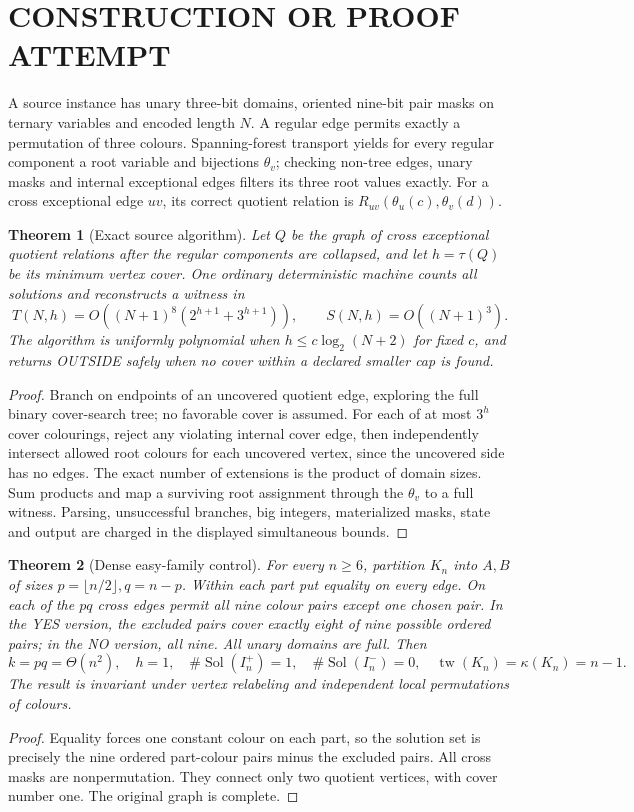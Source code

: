 \documentclass{article}
\newtheorem{theorem}{Theorem}
\begin{document}
\section{CONSTRUCTION OR PROOF ATTEMPT}
A source instance has unary three-bit domains, oriented nine-bit pair masks on ternary variables and encoded length $N$. A regular edge permits exactly a permutation of three colours. Spanning-forest transport yields for every regular component a root variable and bijections $\theta_v$; checking non-tree edges, unary masks and internal exceptional edges filters its three root values exactly. For a cross exceptional edge $uv$, its correct quotient relation is $R_{uv}(\theta_u(c),\theta_v(d))$.

\begin{theorem}[Exact source algorithm]
Let $Q$ be the graph of cross exceptional quotient relations after the regular components are collapsed, and let $h=\tau(Q)$ be its minimum vertex cover. One ordinary deterministic machine counts all solutions and reconstructs a witness in
\[
T(N,h)=O((N+1)^8(2^{h+1}+3^{h+1})),\qquad S(N,h)=O((N+1)^3).
\]
The algorithm is uniformly polynomial when $h\le c\log_2(N+2)$ for fixed $c$, and returns OUTSIDE safely when no cover within a declared smaller cap is found.
\end{theorem}
\begin{proof}
Branch on endpoints of an uncovered quotient edge, exploring the full binary cover-search tree; no favorable cover is assumed. For each of at most $3^h$ cover colourings, reject any violating internal cover edge, then independently intersect allowed root colours for each uncovered vertex, since the uncovered side has no edges. The exact number of extensions is the product of domain sizes. Sum products and map a surviving root assignment through the $\theta_v$ to a full witness. Parsing, unsuccessful branches, big integers, materialized masks, state and output are charged in the displayed simultaneous bounds.
\end{proof}

\begin{theorem}[Dense easy-family control]
For every $n\ge6$, partition $K_n$ into $A,B$ of sizes $p=\lfloor n/2\rfloor,q=n-p$. Within each part put equality on every edge. On each of the $pq$ cross edges permit all nine colour pairs except one chosen pair. In the YES version, the excluded pairs cover exactly eight of nine possible ordered pairs; in the NO version, all nine. All unary domains are full. Then
\[
k=pq=\Theta(n^2),\quad h=1,\quad
\#\operatorname{Sol}(I_n^+)=1,\quad \#\operatorname{Sol}(I_n^-)=0,
\quad \operatorname{tw}(K_n)=\kappa(K_n)=n-1.
\]
The result is invariant under vertex relabeling and independent local permutations of colours.
\end{theorem}
\begin{proof}
Equality forces one constant colour on each part, so the solution set is precisely the nine ordered part-colour pairs minus the excluded pairs. All cross masks are nonpermutation. They connect only two quotient vertices, with cover number one. The original graph is complete.
\end{proof}
\end{document}
